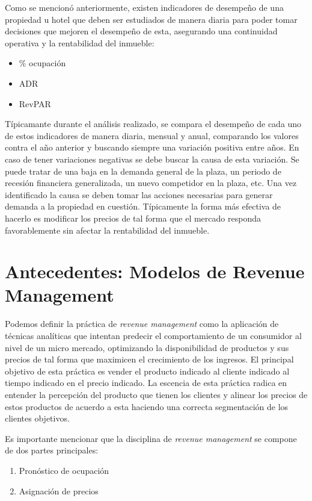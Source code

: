 {Como se mencionó anteriormente, existen indicadores de desempeño de una propiedad u hotel que deben ser estudiados de manera diaria para poder tomar decisiones que mejoren el desempeño de esta, asegurando una continuidad operativa y la rentabilidad del inmueble:

\begin{itemize}
  \item \% ocupación
  \item ADR
  \item RevPAR
\end{itemize}

Típicamante durante el análisis realizado, se compara el desempeño de cada uno de estos indicadores de manera diaria, mensual y anual, comparando los valores contra el año anterior y buscando siempre una variación positiva entre años. En caso de tener variaciones negativas se debe buscar la causa de esta variación. Se puede tratar de una baja en la demanda general de la plaza, un periodo de recesión financiera generalizada, un nuevo competidor en la plaza, etc. Una vez identificado la causa se deben tomar las acciones necesarias para generar demanda a la propiedad en cuestión. Típicamente la forma más efectiva de hacerlo es modificar los precios de tal forma que el mercado responda favorablemente sin afectar la rentabilidad del inmueble.

\section*{Antecedentes: Modelos de Revenue Management}

Podemos definir la práctica de \emph{revenue management} como la aplicación de técnicas analíticas que intentan predecir el comportamiento de un consumidor al nivel de un micro mercado, optimizando la disponibilidad de productos y sus precios de tal forma que maximicen el crecimiento de los ingresos. El principal objetivo de esta práctica es vender el producto indicado al cliente indicado al tiempo indicado en el precio indicado. La escencia de esta práctica radica en entender la percepción del producto que tienen los clientes y alinear los precios de estos productos de acuerdo a esta haciendo una correcta segmentación de los clientes objetivos.

Es importante mencionar que la disciplina de \emph{revenue management} se compone de dos partes principales:
\begin{enumerate}
  \item Pronóstico de ocupación
  \item Asignación de precios
\end{enumerate}

}
